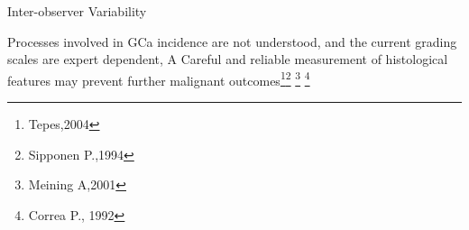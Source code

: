 \documentclass[usenames,dvipsnames]{beamer}
\let\oldfootnote\footnote
\renewcommand\footnote[1][]{\footnotesize\oldfootnote[frame,#1]}
\renewcommand{\footnotesize}{\tiny}
\begin{document}
\begin{frame}{Inter-observer Variability}

\end{frame}

\begin{frame}

\begin{alertblock}{}{
 Processes involved in GCa incidence are not understood, and the current grading scales are expert dependent, A Careful and reliable measurement of histological features may prevent further malignant outcomes\footnote[5]{Tepes,2004}\footnote[6]{Sipponen P.,1994} \footnote[7]{Meining A,2001} \footnote[8]{Correa P., 1992}} 

\end{alertblock}
\end{frame}
\end{document}
